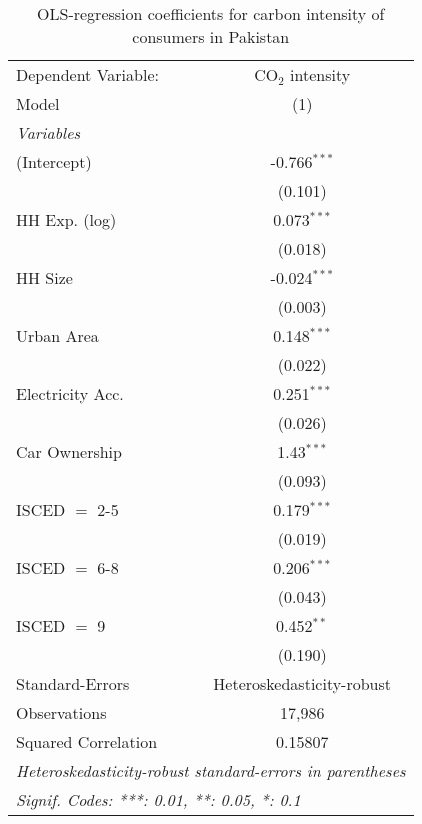 
\begin{table}[htbp!]
   \centering
   \small
   \begin{adjustbox}{width = 1\textwidth, max height = 0.95\textheight, center}
      \begin{threeparttable}[b]
         \caption{\label{tab:OLS_1_PAK} OLS-regression coefficients for carbon intensity of consumers in Pakistan}
         \begin{tabular}{lc}
            \tabularnewline \midrule \midrule
            Dependent Variable: & CO$_{2}$ intensity\\  
            Model               & (1)\\  
            \midrule
            \emph{Variables}\\
            (Intercept)         & -0.766$^{***}$\\   
                                & (0.101)\\   
            HH Exp. (log)       & 0.073$^{***}$\\   
                                & (0.018)\\   
            HH Size             & -0.024$^{***}$\\   
                                & (0.003)\\   
            Urban Area          & 0.148$^{***}$\\   
                                & (0.022)\\   
            Electricity Acc.    & 0.251$^{***}$\\   
                                & (0.026)\\   
            Car Ownership       & 1.43$^{***}$\\   
                                & (0.093)\\   
            ISCED $=$ 2-5       & 0.179$^{***}$\\   
                                & (0.019)\\   
            ISCED $=$ 6-8       & 0.206$^{***}$\\   
                                & (0.043)\\   
            ISCED $=$ 9         & 0.452$^{**}$\\   
                                & (0.190)\\   
            \midrule 
            Standard-Errors     & Heteroskedasticity-robust \\   
            Observations        & 17,986\\  
            Squared Correlation & 0.15807\\  
            \midrule \midrule
            \multicolumn{2}{l}{\emph{Heteroskedasticity-robust standard-errors in parentheses}}\\
            \multicolumn{2}{l}{\emph{Signif. Codes: ***: 0.01, **: 0.05, *: 0.1}}\\
         \end{tabular}
         

\end{threeparttable}
\end{adjustbox}
\end{table}
